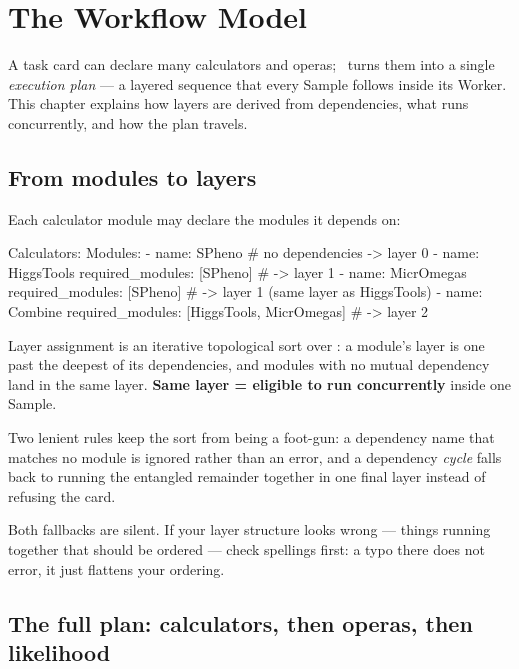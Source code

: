 \chapter{The Workflow Model}
\label{ch:workflow-model}

 A task card can declare many calculators and
operas; \Jtwo\ turns them into a single \emph{execution plan} --- a layered sequence that
every Sample follows inside its Worker. This chapter explains how layers are derived from
dependencies, what runs concurrently, and how the plan travels.

\section{From modules to layers}
\label{sec:layers}

Each calculator module may declare the modules it depends on:

\begin{yamlwin}
Calculators:
  Modules:
    - name: SPheno            # no dependencies -> layer 0
    - name: HiggsTools
      required_modules: [SPheno]     # -> layer 1
    - name: MicrOmegas
      required_modules: [SPheno]     # -> layer 1 (same layer as HiggsTools)
    - name: Combine
      required_modules: [HiggsTools, MicrOmegas]   # -> layer 2
\end{yamlwin}

Layer assignment is an iterative topological sort over : a
module's layer is one past the deepest of its dependencies, and modules with no mutual
dependency land in the same layer. \textbf{Same layer = eligible to run concurrently}
inside one Sample.

Two lenient rules keep the sort from being a foot-gun: a dependency name that matches no
module is ignored rather than an error, and a dependency \emph{cycle} falls back to
running the entangled remainder together in one final layer instead of refusing the card.

\begin{jwarn}
Both fallbacks are silent. If your layer structure looks wrong --- things running
together that should be ordered --- check  spellings first: a
typo there does not error, it just flattens your ordering.
\end{jwarn}

\section{The full plan: calculators, then operas, then likelihood}
\label{sec:plan-order}

